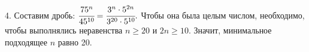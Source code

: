 4. Составим дробь: $\cfrac{75^n}{45^{10}}=\cfrac{3^{n}\cdot5^{2n}}{3^{20}\cdot5^{10}}.$ Чтобы она была целым числом, необходимо, чтобы выполнялись неравенства $n\geqslant20$ и $2n\geqslant10.$ Значит, минимальное подходящее $n$ равно 20.\\
